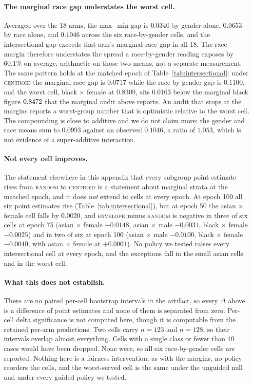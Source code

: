 \documentclass{article}
\newcommand{\ArmBest}{\textsc{centroid}}
\begin{document}
\paragraph{The marginal race gap understates the worst cell.} Averaged over the
18 arms, the max$-$min gap is $0.0340$ by gender alone, $0.0653$ by race alone, and
$0.1046$ across the six race-by-gender cells, and the intersectional gap exceeds
that arm's marginal race gap in all 18. The race margin therefore understates
the spread a race-by-gender reading exposes by $60.1\%$ on average, arithmetic on
those two means, not a separate measurement. The same pattern holds at the
matched epoch of Table~\ref{tab:intersectional}: under \ArmBest{} the marginal
race gap is $0.0717$ while the race-by-gender gap is $0.1100$, and the worst cell,
black $\times$ female at $0.8309$, sits $0.0163$ below the marginal black figure
$0.8472$ that the marginal audit above reports. An audit that stops
at the margins reports a worst-group number that is optimistic relative to the
worst cell. The compounding is close to additive and we do not claim more: the
gender and race means sum to $0.0993$ against an observed $0.1046$, a ratio of
$1.053$, which is not evidence of a super-additive interaction.

\paragraph{Not every cell improves.} The statement elsewhere in this appendix
that every subgroup point estimate rises from \textsc{random} to \ArmBest{} is a
statement about marginal strata at the matched epoch, and it does \emph{not}
extend to cells at every epoch. At epoch 100 all six point estimates rise
(Table~\ref{tab:intersectional}), but at epoch 50 the asian $\times$ female cell
falls by $0.0020$, and \textsc{envelope} minus \textsc{random} is negative in
three of six cells at epoch 75 (asian $\times$ female $-0.0148$, asian $\times$
male $-0.0031$, black $\times$ female $-0.0025$) and in two of six at epoch 100
(asian $\times$ male $-0.0100$, black $\times$ female $-0.0040$, with asian
$\times$ female at $+0.0001$). No policy we tested raises every intersectional
cell at every epoch, and the exceptions fall in the small asian cells and in the
worst cell.

\paragraph{What this does not establish.} There are no paired per-cell bootstrap
intervals in the artifact, so every $\Delta$ above is a difference of point
estimates and none of them is separated from zero. Per-cell delta significance
is not computed here, though it is computable from the retained per-arm
predictions. Two cells
carry $n{=}123$ and $n{=}128$, so their intervals overlap almost everything.
Cells with a single class or fewer than $40$ cases would have been dropped. None
were, so all six race-by-gender cells are reported. Nothing here is a fairness
intervention: as with the margins, no policy reorders the cells, and the
worst-served cell is the same under the unguided null and under every guided
policy we tested.
\end{document}
